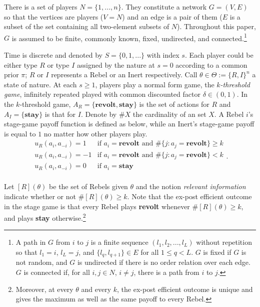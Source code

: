 \documentclass[12pt,letter]{article}
\theoremstyle{definition}
\theoremstyle{definition}
\theoremstyle{remark}
\theoremstyle{claim}
\begin{document}
There is a set of players $N=\{1,...,n\}$. They constitute a network $G=(V,E)$ so that the vertices are players ($V=N$) and an edge is a pair of them ($E$ is a subset of the set containing all two-element subsets of $N$). Throughout this paper, $G$ is assumed to be finite, commonly known, fixed, undirected, and connected.\footnote{A path in $G$ from $i$ to $j$ is a finite sequence $(l_1,l_2,...,l_L)$ without repetition so that $l_1=i$, $l_L=j$, and $\{l_q,l_{q+1}\}\in E$ for all $1\leq q<L$. $G$ is fixed if $G$ is not random, and $G$ is undirected if there is no order relation over each edge. $G$ is connected if, for all $i,j\in N$, $i\neq j$, there is a path from $i$ to $j$.}

Time is discrete and denoted by $S=\{0,1,...\}$ with index $s$. Each player could be either type $R$ or type $I$ assigned by the nature at $s=0$ according to a common prior $\pi$; $R$ or $I$ represents a Rebel or an Inert respectively. Call $\theta\in \Theta:= \{R,I\}^n$ a state of nature. At each $s\geq 1$, players play a normal form game, the \textit{$k$-threshold game}, infinitely repeated played with common discounted factor $\delta\in (0,1)$. In the $k$-threshold game, $A_R=\{\textbf{revolt}, \textbf{stay}\}$ is the set of actions for $R$ and $A_I=\{\textbf{stay}\}$ is that for $I$. Denote by $\#X$ the cardinality of an set $X$. A Rebel $i$'s stage-game payoff function is defined as below, while an Inert's stage-game payoff is equal to $1$ no matter how other players play. 
\[   
\begin{array}{ll}
      u_{R}(a_{i},a_{-i})=1 & \text{if $a_{i}=\textbf{revolt}$ and $\#\{j:a_{j}=\textbf{revolt}\}\geq k$} \\
      u_{R}(a_{i},a_{-i})=-1 & \text{if $a_{i}=\textbf{revolt}$ and $\#\{j:a_{j}=\textbf{revolt}\}< k$} \\
      u_{R}(a_{i},a_{-i})=0 & \text{if $a_{i}=\textbf{stay}$} \\
\end{array} 
. \]



Let $[R](\theta)$ be the set of Rebels given $\theta$ and the notion \textit{relevant information} indicate whether or not $\#[R](\theta)\geq k$. Note that the ex-post efficient outcome in the stage game is that every Rebel plays \textbf{revolt} whenever $\#[R](\theta)\geq k$, and plays \textbf{stay} otherwise.\footnote{Moreover, at every $\theta$ and every $k$, the ex-post efficient outcome is unique and gives the maximum as well as the same payoff to every Rebel.} 
\end{document}
